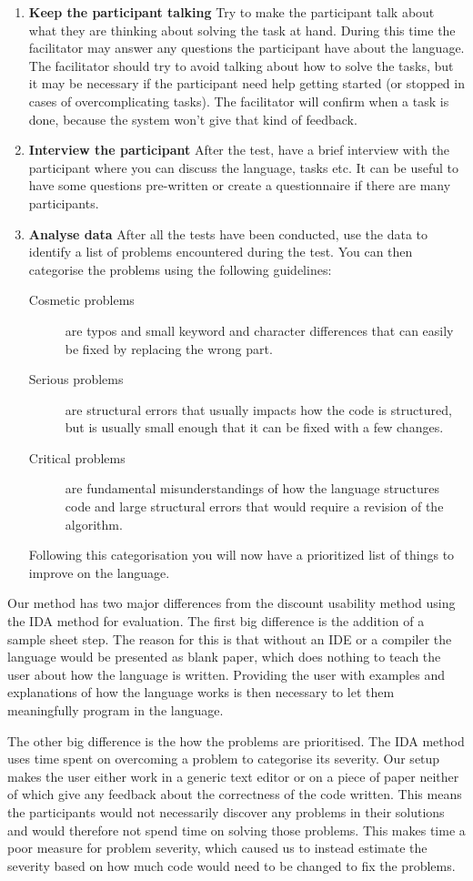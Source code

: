 \documentclass[preprint,10pt]{sigplanconf}
\begin{document}
\begin{enumerate}
\item \textbf{Keep the participant talking} Try to make the participant talk about what they are thinking about solving the task at hand. During this time the facilitator may answer any questions the participant have about the language. The facilitator should try to avoid talking about how to solve the tasks, but it may be necessary if the participant need help getting started (or stopped in cases of overcomplicating tasks). The facilitator will confirm when a task is done, because the system won't give that kind of feedback.
\item \textbf{Interview the participant} After the test, have a brief interview with the participant where you can discuss the language, tasks etc. It can be useful to have some questions pre-written or create a questionnaire if there are many participants.
\item \textbf{Analyse data} After all the tests have been conducted, use the data to identify a list of problems encountered during the test. You can then categorise the problems using the following guidelines:
\begin{description}
\item[Cosmetic problems] are typos and small keyword and character differences that can easily be fixed by replacing the wrong part.
\item[Serious problems] are structural errors that usually impacts how the code is structured, but is usually small enough that it can be fixed with a few changes.
\item[Critical problems] are fundamental misunderstandings of how the language structures code and large structural errors that would require a revision of the algorithm.
\end{description}
Following this categorisation you will now have a prioritized list of things to improve on the language.
\end{enumerate}

Our method has two major differences from the discount usability method using the IDA method for evaluation.
The first big difference is the addition of a sample sheet step. The reason for this is that without an IDE or a compiler the language would be presented as blank paper, which does nothing to teach the user about how the language is written. Providing the user with examples and explanations of how the language works is then necessary to let them meaningfully program in the language.

The other big difference is the how the problems are prioritised. The IDA method uses time spent on overcoming a problem to categorise its severity. Our setup makes the user either work in a generic text editor or on a piece of paper neither of which give any feedback about the correctness of the code written. This means the participants would not necessarily discover any problems in their solutions and would therefore not spend time on solving those problems.
This makes time a poor measure for problem severity, which caused us to instead estimate the severity based on how much code would need to be changed to fix the problems.
\end{document}
